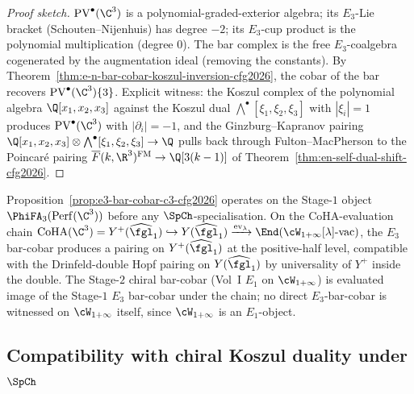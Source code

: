 \begin{proof}[Proof sketch]
$\mathrm{PV}^\bullet(\C^3)$ is a polynomial-graded-exterior algebra; its
$E_3$-Lie bracket (Schouten--Nijenhuis) has degree $-2$; its $E_3$-cup
product is the polynomial multiplication (degree $0$). The bar complex
is the free $E_3$-coalgebra cogenerated by the augmentation ideal
(removing the constants). By
Theorem~\textup{\ref{thm:e-n-bar-cobar-koszul-inversion-cfg2026}}, the
cobar of the bar recovers $\mathrm{PV}^\bullet(\C^3)\{3\}$. Explicit
witness: the Koszul complex of the polynomial algebra
$\Q[x_1, x_2, x_3]$ against the Koszul dual
$\bigwedge^\bullet[\xi_1, \xi_2, \xi_3]$ with $|\xi_i| = 1$ produces
$\mathrm{PV}^\bullet(\C^3)$ with $|\partial_i| = -1$, and the
Ginzburg--Kapranov pairing
$\Q[x_1, x_2, x_3] \otimes \bigwedge^\bullet[\xi_1, \xi_2, \xi_3] \to \Q$
pulls back through Fulton--MacPherson to the Poincar\'e pairing
$\overline{F}(k, \R^3)^{\mathrm{FM}} \to \Q[3(k-1)]$ of
Theorem~\textup{\ref{thm:en-self-dual-shift-cfg2026}}.
\end{proof}

\begin{remark}
\label{rem:coha-eval-chain-e3-bar-cobar-cfg2026}
Proposition~\textup{\ref{prop:e3-bar-cobar-c3-cfg2026}} operates on the
Stage-$1$ object $\PhiFA_3(\mathrm{Perf}(\C^3))$ before any
$\SpCh$-specialisation. On the CoHA-evaluation chain
$\mathrm{CoHA}(\C^3) = Y^+(\widehat{\fgl}_1) \hookrightarrow
Y(\widehat{\fgl}_1) \xrightarrow{\mathrm{ev}_\lambda}
\End(\cW_{1+\infty}[\lambda]\text{-vac})$, the $E_3$ bar-cobar
produces a pairing on $Y^+(\widehat{\fgl}_1)$ at the positive-half
level, compatible with the Drinfeld-double Hopf pairing on
$Y(\widehat{\fgl}_1)$ by universality of $Y^+$ inside the double. The
Stage-$2$ chiral bar-cobar (Vol~I $E_1$ on $\cW_{1+\infty}$) is
evaluated image of the Stage-$1$ $E_3$ bar-cobar under the chain; no
direct $E_3$-bar-cobar is witnessed on $\cW_{1+\infty}$ itself, since
$\cW_{1+\infty}$ is an $E_1$-object.
\end{remark}

\subsection*{Compatibility with chiral Koszul duality under $\SpCh$}

